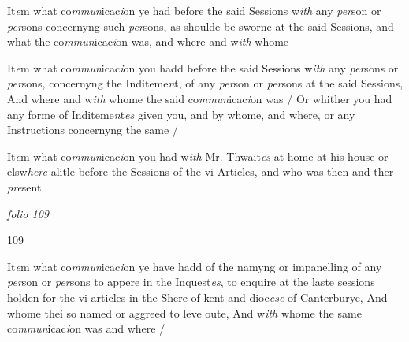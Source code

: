 \documentclass[12pt, a4paper]{book}
\begin{document}
				\marginpar[\vspace{0.5cm}{\textcolor{Gray}{13}}]{}
			
		\ifthenelse{\isodd{\thepage}}
		{\reversemarginpar}
		{\normalmarginpar}
		 It\textit{e}m what co\textit{mmun}icac\textit{i}on ye had before the said Sessions w\textit{ith} any
 \textit{per}son or \textit{per}sons concernyng such \textit{per}sons, as shoulde be sworne
 at the said Sessions, and what the co\textit{mmun}icac\textit{i}on was, and
 where and w\textit{ith} whome
 




				\marginpar[\vspace{0.5cm}{\textcolor{Gray}{14}}]{}
			
		\ifthenelse{\isodd{\thepage}}
		{\reversemarginpar}
		{\normalmarginpar}
		 It\textit{e}m what co\textit{mmun}icac\textit{i}on you hadd before the said Sessions w\textit{ith} any
 \textit{per}sons or \textit{per}sons, concernyng the Inditeme\textit{n}t, of any \textit{per}son
 or \textit{per}sons at the said Sessions, And where and w\textit{ith} whome
 the said co\textit{mmun}icac\textit{i}on was / Or whither you had any forme of
 Inditeme\textit{n}t\textit{es} given you, and by whome, and where, or any
 Instructions concernyng the same /
 



	
				\marginpar[\vspace{0.5cm}{\textcolor{Gray}{15}}]{}
			
		\ifthenelse{\isodd{\thepage}}
		{\reversemarginpar}
		{\normalmarginpar}
		 It\textit{e}m what co\textit{mmun}icac\textit{i}on you had w\textit{ith} Mr. Thwait\textit{es} 
	at home at his house or elsw\textit{here}
			 alitle before the
 Sessions of the vi Articles, and who was then and ther
 \textit{pre}sent

\dotfill
					

\textit{folio 109}


\begin{flushright}{\color{Mahogany}109}\end{flushright}
 



				\marginpar[\vspace{0.5cm}{\textcolor{Gray}{16}}]{}
			
		\ifthenelse{\isodd{\thepage}}
		{\reversemarginpar}
		{\normalmarginpar}
		 It\textit{e}m what co\textit{mmun}icac\textit{i}on ye have hadd of the namyng or impanelling
 of any \textit{per}son or \textit{per}sons to appere in the Inquest\textit{es}, to enquire at
 the laste sessions holden for the vi articles in the Shere of kent
	and dioc\textit{ese} of Canterburye, And whome thei so named or
 aggreed to leve oute, And w\textit{ith} whome the same co\textit{mmun}icac\textit{i}on was
 and where /
 
\end{document}
